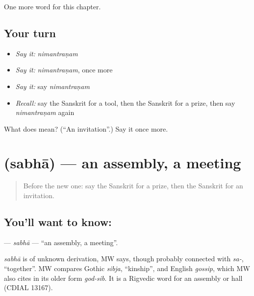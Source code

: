 \begin{grammarlens}[title={What you've built}]
One more word for this chapter.
\end{grammarlens}

\subsection*{Your turn}
\begin{itemize}
\raggedright
  \item \emph{Say it:} \emph{nimantraṇam}
  \item \emph{Say it:} \emph{nimantraṇam}, once more
  \item \emph{Say it:} say \emph{nimantraṇam}
  \item \emph{Recall:} say the Sanskrit for a tool, then the Sanskrit for a prize, then say \emph{nimantraṇam} again
\end{itemize}

\begin{tcolorbox}[breakable,colback=teal!4,colframe=teal!35!black,title={Before you move on}]
What does  mean? (\textquotedblleft{}An invitation\textquotedblright{}.) Say it once more.
\end{tcolorbox}
\section[\texorpdfstring{\sk{सभा} (sabhā)}{सभा (sabhā)}]{ (sabhā) — an assembly, a meeting}

\label{lesson:SA-C194-sabha}



\begin{quote}
Before the new one: say the Sanskrit for a prize, then the Sanskrit for an invitation.
\end{quote}

\subsection*{You'll want to know: }
\textbf{} — \emph{sabhā} — \textquotedblleft{}an assembly, a meeting\textquotedblright{}.

\begin{cousinweb}
\emph{sabhā} is of unknown derivation, MW says, though probably connected with \emph{sa-}, \textquotedblleft{}together\textquotedblright{}. MW compares Gothic \emph{sibja}, \textquotedblleft{}kinship\textquotedblright{}, and English \emph{gossip}, which MW also cites in its older form \emph{god-sib}. It is a Rigvedic word for an assembly or hall (CDIAL 13167).
\end{cousinweb}

